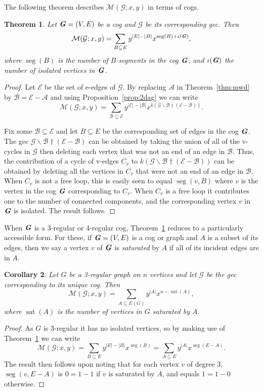 \documentclass{amsart}
\newcommand{\gec}[1]{\mathcal{#1}}
\newcommand{\calM}{\mathcal{M}}
\newcommand{\cog}[1]{\textbf{\textit #1}}
\newcommand{\ba}{\mathbin{\backslash}}
\newcommand{\ext}{\mathbin{\dagger}}
\DeclareMathOperator{\seg}{seg}
\DeclareMathOperator{\sat}{sat}
\newtheorem{theorem}{Theorem}[section]
\newtheorem{corollary}[theorem]{Corollary}
\theoremstyle{definition}
\theoremstyle{remark}
\numberwithin{equation}{section}
\begin{document}
 

The following theorem describes $ \calM(\gec{G};x, y)$  in terms of cogs.
\begin{theorem}\label{thm:rda}
Let $\cog{G}=(V,E)$ be a cog and $\gec{G}$ be its corresponding gec. Then
\[
 \calM(\gec{G};x, y) = \sum_{B\subseteq E}   y^{|E|-|B|} x^{\seg(B)+\iota(\cog{G})}, 
 \]
where $\seg(B)$ is the number of $B$-segments in the cog $\cog{G}$, and $\iota(\cog{G})$ the number of isolated vertices in $\cog{G}$.
\end{theorem}
\begin{proof}
Let $\mathcal{E}$ be the set of e-edges of $\gec{G}$. 
By replacing $\mathcal{A}$ in Theorem~\ref{thm:mwd} by $\mathcal{B} = \mathcal{E}-\mathcal{A}$ and using Proposition~\ref{prop:2dag} we can write 
\[
\calM(\gec{G};x,y) = \sum_{\mathcal{B} \subseteq \mathcal{E}} y^{|\mathcal{E}|-|\mathcal{B}|}x^{k(\gec{G}\ba \mathcal{B} \ext (\mathcal{E}-\mathcal{B}))}.
\]

Fix some $\mathcal{B} \subseteq \mathcal{E}$ and let $B\subseteq E$ be the corresponding set of edges in the cog $\cog{G}$. 
The gec
$\gec{G}\ba \mathcal{B} \ext (\mathcal{E}-\mathcal{B})$ can be obtained by taking the union of all of the v-cycles in $\gec{G}$ then deleting each vertex that was not an end of an edge in $\mathcal{B}$. 
Thus, the contribution of a cycle of v-edges $C_v$ to $k(\gec{G}\ba \mathcal{B} \ext (\mathcal{E}-\mathcal{B}))$ can be obtained by deleting all the vertices in $C_v$ that were not an end of an edge in $\mathcal{B}$. When $C_v$ is not a free loop, this is easily seen to equal $\seg(v,B)$ where $v$ is the vertex in the cog $\cog{G}$ corresponding to $C_v$. 
When $C_v$ is a free loop it contributes one to the number of connected components, and the corresponding vertex $v$ in $\cog{G}$ is isolated.
The result follows.
\end{proof}


When $\cog{G}$ is a 3-regular or 4-regular cog, Theorem~\ref{thm:rda} reduces to a particularly accessible form.
 For these, if $\cog{G}=(V,E)$ is a cog or graph and $A$ is a subset of its edges, then we say a vertex $v$ of $\cog{G}$ is \emph{saturated} by $A$ if all of its incident edges are in $A$. 
\begin{corollary}\label{cor:fgh}
Let $G$ be a 3-regular graph on $n$ vertices and let $\gec{G}$ be the gec corresponding to its unique cog. Then
\[    \calM(\gec{G};x, y) = \sum_{A\subseteq E(G)} y^{|A|} x^{n-\sat(A)} ,\] 
where $\sat(A)$ is the number of vertices in $G$  saturated by $A$. 
\end{corollary}
\begin{proof}
As $G$ is 3-regular it has no isolated vertices, so by making use of Theorem~\ref{thm:rda} we can write
\[ \calM(\gec{G};x, y) = \sum_{B\subseteq E}   y^{|E|-|B|} x^{\seg(B)} = \sum_{A\subseteq E}   y^{|A|} x^{\seg(E-A)}. \]
The result then follows upon noting that for each vertex $v$ of degree 3, $\seg(v, E-A)$ is $ 0=1-1$ if $v$ is saturated by $A$, and equals $1=1-0$ otherwise. 
\end{proof}
\end{document}

